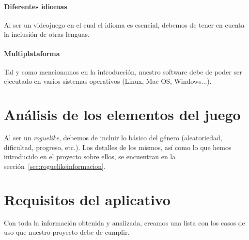 	\paragraph{Diferentes idiomas} Al ser un videojuego en el cual el idioma es esencial, debemos de tener en cuenta la inclusión de otras lenguas.
	\paragraph{Multiplataforma} Tal y como mencionamos en la introducción, nuestro software debe de poder ser ejecutado en varios sistemas operativos (Linux, Mac OS, Windows...).


\section{Análisis de los elementos del juego}
Al ser un \textit{roguelike}, debemos de incluir lo básico del género (aleatoriedad, dificultad, progreso, etc.). Los detalles de los mismos, así como lo que hemos introducido en el proyecto sobre ellos, se encuentran en la sección~\ref{sec:roguelikeinformacion}.

\section{Requisitos del aplicativo}
Con toda la información obtenida y analizada, creamos una lista con los casos de uso que nuestro proyecto debe de cumplir.

